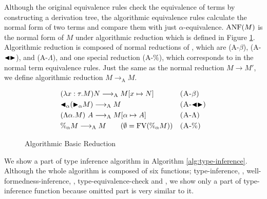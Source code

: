 \begin{center}
\end{center}

Although the original equivalence rules check the equivalence of terms by
constructing a derivation tree, the algorithmic equivalence rules calculate the
normal form of two terms and compare them with just \( \alpha \)-equivalence.
\( \text{ANF}(M) \) is the normal form of \( M \) under algorithmic reduction which is
defined in Figure \ref{fig:algorithmic-reduction}. Algorithmic reduction is
composed of normal reductions of \LMD, which are \textsc{(A-$\beta$)},
\textsc{(A-${\mathop{\blacktriangleleft}}{\mathop{\blacktriangleright}}$)}, and \textsc{(A-$\Lambda$)}, and one special reduction
\textsc{(A-$\%$)}, which corresponds to \QPercent in the normal term
equivalence rules. Just the same as the normal reduction \( M \longrightarrow
M' \), we define algorithmic reduction \( M \longrightarrow_{\text{A}} M \).  

\begin{figure}[tbp]
    \begin{center}
        \begin{align*}
            & (\lambda x:\tau.M) N \longrightarrow_{\text{A}} M[x \mapsto N]       &  & \textsc{(A-$\beta$)}   \\
            & {\mathop{\blacktriangleleft}}_\alpha ({\mathop{\blacktriangleright}}_\alpha M) \longrightarrow_{\text{A}} M              &  & \textsc{(A-${\mathop{\blacktriangleleft}}{\mathop{\blacktriangleright}}$)} \\
            & (\Lambda \alpha.M)\ A \longrightarrow_{\text{A}} M[\alpha \mapsto A] &  & \textsc{(A-$\Lambda$)} \\
            & \%_\alpha M \longrightarrow_{\text{A}} M \qquad (\emptyset = \text{FV}(\%_\alpha M)) &  & \textsc{(A-$\%$)}
        \end{align*}
    \end{center}
    \caption{Algorithmic Basic Reduction}
    \label{fig:algorithmic-reduction}
\end{figure}


We show a part of type inference algorithm in Algorithm
\ref{alg:type-inference}. Although the whole algorithm is composed of six
functions; {\sc type-inference}, {}, {\sc
well-formedness-inference}, {}, {\sc
type-equivalence-check} and {}, we show only a part
of {\sc type-inference} function because omitted part is very similar to it.

